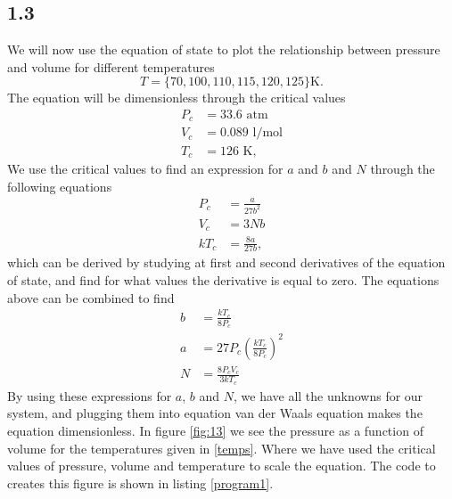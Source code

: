 \documentclass[a4paper,10pt, english]{article}
\begin{document}
\subsection*{1.3}
We will now use the equation of state to plot the relationship between pressure and volume for different temperatures
\begin{equation}
    T = \{70, 100, 110, 115, 120, 125\}\text{K}. \label{temps}
\end{equation}
The equation will be dimensionless through the critical values
\begin{align*}
    P_c &= 33.6 \text{ atm} \\
    V_c &= 0.089 \text{ l/mol} \\
    T_c &= 126 \text{ K},
\end{align*}
We use the critical values to find an expression for $a$ and $b$ and $N$ through the following equations
\begin{align*}
    P_c &= \frac{a}{27b^2}  \\
    V_c &= 3Nb \\
    kT_c &= \frac{8a}{27b},
\end{align*}
which can be derived by studying at first and second derivatives of the equation of state, and find for what values the derivative is equal to zero. The equations above can be combined to find
\begin{align*}
    b &= \frac{kT_c}{8P_c} \\
    a &= 27P_c\left(\frac{kT_c}{8P_c}\right)^2 \\
    N &= \frac{8P_cV_c}{3kT_c}
\end{align*}
By using these expressions for $a$, $b$ and $N$, we have all the unknowns for our system, and plugging them into equation van der Waals equation makes the equation dimensionless.
In figure \vref{fig:13} we see the pressure as a function of volume for the temperatures given in \eqref{temps}. Where we have used the critical values of pressure, volume and temperature to scale the equation. The code to creates this figure is shown in listing \vref{program1}.
\end{document}
